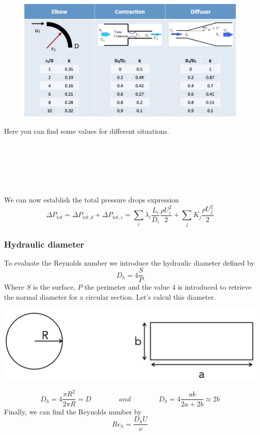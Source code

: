 	\begin{figure}
	\vspace{-5mm}
	\includegraphics[scale=0.25]{ch2/8}
	\end{figure}
	Here you can find some values for different situations. \\\\\\\\\\\\\\
	We can now establish the total pressure drops expression 
	\begin{equation}
		\Delta P_{tot} = \Delta P_{tot,d} + \Delta P_{tot,c} = \sum _i \lambda _i \frac{L_i}{D_i}\frac{\rho U_i^2}{2} + \sum _j K_j \frac{\rho U_j^2}{2}
	\end{equation}	 
	
	\subsubsection{Hydraulic diameter}
		To evaluate the Reynolds number we introduce the hydraulic diameter defined by 
		\begin{equation}
			D_h = 4\frac{S}{P}
		\end{equation}
		Where $S$ is the surface, $P$ the perimeter and the value 4 is introduced to retrieve the normal diameter for a circular section. Let's calcul this diameter.
		\begin{center}
		\includegraphics[scale=0.4]{ch2/9}
		\end{center}
		\begin{equation}
			D_h = 4\frac{\pi R^2}{2\pi R} = D \qquad\qquad and \qquad\qquad D_h = 4 \frac{ab}{2a+2b} \approx 2b
		\end{equation}
		Finally, we can find the Reynolds number by
		\begin{equation}
			Re_h = \frac{D_hU}{\nu}
		\end{equation}